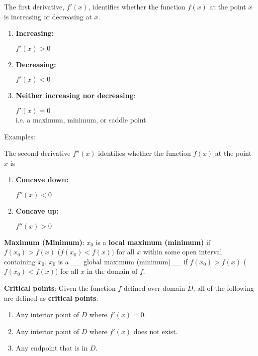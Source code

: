 \documentclass[]{book}
\providecommand{\tightlist}{%
  \setlength{\itemsep}{0pt}\setlength{\parskip}{0pt}}
\theoremstyle{definition}
\theoremstyle{definition}
\theoremstyle{definition}
\theoremstyle{remark}
\begin{document}
The first derivative, \(f'(x)\), identifies whether the function
\(f(x)\) at the point \(x\) is increasing or decreasing at \(x\).

\begin{enumerate}
        \item \parbox[t]{4in}{\bf Increasing:} $f'(x)>0$
        \item \parbox[t]{4in}{\bf Decreasing:} $f'(x)<0$
        \item \parbox[t]{4in}{{\bf Neither increasing nor decreasing}:} $f'(x)=0$\\
             i.e. a maximum, minimum, or saddle point
\end{enumerate}

Examples:

\begin{comment}
    \begin{enumerate}
        \item \parbox[c]{4.75in}{$f(x)=x^2+2$, $f'(x)=2x$}
            \parbox[c]{1in}{\,  {\texttt{[image: deriv1.eps]}}}
        \item \parbox[c]{4.75in}{$f(x)=x^3+2$, $f'(x)=3x^2$}
            \parbox[c]{1in}{\,  {\texttt{[image: deriv2.eps]}}}
    \end{enumerate}
    \end{comment}

The second derivative \(f''(x)\) identifies whether the function
\(f(x)\) at the point \(x\) is

\begin{enumerate}
        \item \parbox[t]{2in}{\bf Concave down:} $f''(x)<0$
        \item \parbox[t]{2in}{\bf Concave up:} $f''(x)>0$
\end{enumerate}

\textbf{Maximum (Minimum)}: \(x_0\) is a \textbf{local maximum
(minimum)} if \(f(x_0)>f(x)\) (\(f(x_0)<f(x))\) for all \(x\) within
some open interval containing \(x_0\). \(x_0\) is a \_\_ global maximum
(minimum)\_\_ if \(f(x_0)>f(x)\) (\(f(x_0)<f(x))\) for all \(x\) in the
domain of \(f\).

\textbf{Critical points}: Given the function \(f\) defined over domain
\(D\), all of the following are defined as \textbf{critical points}:

\begin{enumerate}
\def\labelenumi{\arabic{enumi}.}
\tightlist
\item
  Any interior point of \(D\) where \(f'(x)=0\).
\item
  Any interior point of \(D\) where \(f'(x)\) does not exist.
\item
  Any endpoint that is in \(D\).
\end{enumerate}
\end{document}
